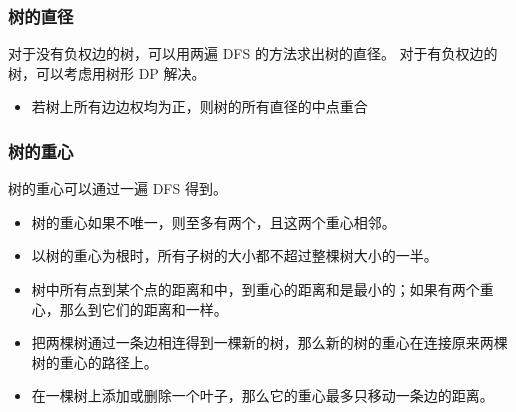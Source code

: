\subsubsection{树的直径}
对于没有负权边的树，可以用两遍 DFS 的方法求出树的直径。
对于有负权边的树，可以考虑用树形 DP 解决。
\begin{itemize}
	\item 若树上所有边边权均为正，则树的所有直径的中点重合
\end{itemize}

\subsubsection{树的重心}
树的重心可以通过一遍 DFS 得到。
\begin{itemize}
	\item 树的重心如果不唯一，则至多有两个，且这两个重心相邻。
	\item 以树的重心为根时，所有子树的大小都不超过整棵树大小的一半。
	\item 树中所有点到某个点的距离和中，到重心的距离和是最小的；如果有两个重心，那么到它们的距离和一样。
	\item 把两棵树通过一条边相连得到一棵新的树，那么新的树的重心在连接原来两棵树的重心的路径上。
	\item 在一棵树上添加或删除一个叶子，那么它的重心最多只移动一条边的距离。
\end{itemize}